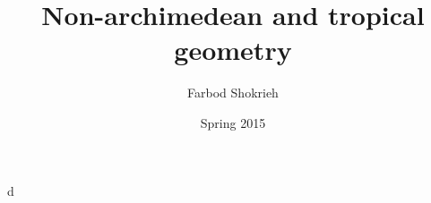\documentclass[oneside]{article}
\title{Non-archimedean and tropical geometry}
\author{Farbod Shokrieh}
\date{Spring 2015}
\begin{document}
\maketitle
\tableofcontents





d
\end{document}
